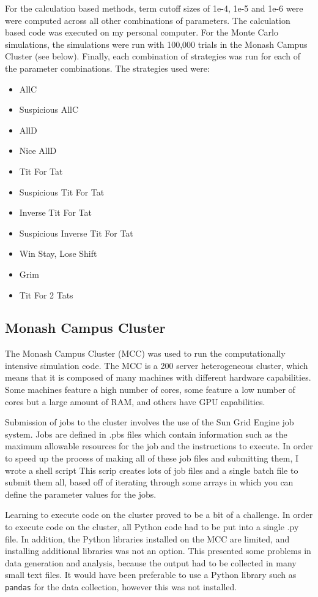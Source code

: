 \documentclass[a4paper,12pt]{article}
\begin{document}
For the calculation based methods, term cutoff sizes of 1e-4, 1e-5 and 1e-6 were were computed across all other combinations of parameters.
The calculation based code was executed on my personal computer.
For the Monte Carlo simulations, the simulations were run with 100,000 trials in the Monash Campus Cluster (see below).
Finally, each combination of strategies was run for each of the parameter combinations.
The strategies used were:

\begin{itemize}
    \item AllC
    \item Suspicious AllC
    \item AllD
    \item Nice AllD
    \item Tit For Tat
    \item Suspicious Tit For Tat
    \item Inverse Tit For Tat
    \item Suspicious Inverse Tit For Tat
    \item Win Stay, Lose Shift
    \item Grim
    \item Tit For 2 Tats
\end{itemize}

\subsection{Monash Campus Cluster}

The Monash Campus Cluster (MCC) was used to run the computationally intensive simulation code.
The MCC is a 200 server heterogeneous cluster, which means that it is composed of many machines with different hardware capabilities.
Some machines feature a high number of cores, some feature a low number of cores but a large amount of RAM, and others have GPU capabilities.

Submission of jobs to the cluster involves the use of the Sun Grid Engine job system.
Jobs are defined in .pbs files which contain information such as the maximum allowable resources for the job and the instructions to execute.
In order to speed up the process of making all of these job files and submitting them, I wrote a shell script
This scrip creates lots of job files and a single batch file to submit them all, based off of iterating through some arrays in which you can define the parameter values for the jobs.

Learning to execute code on the cluster proved to be a bit of a challenge.
In order to execute code on the cluster, all Python code had to be put into a single .py file.
In addition, the Python libraries installed on the MCC are limited, and installing additional libraries was not an option.
This presented some problems in data generation and analysis, because the output had to be collected in many small text files.
It would have been preferable to use a Python library such as \texttt{pandas} for the data collection, however this was not installed.
\end{document}
